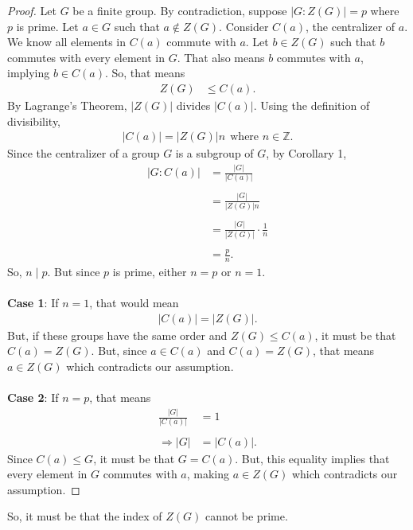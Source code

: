 \documentclass[12pt, letterpaper]{article}
\begin{document}
\begin{proof}
    Let $G$ be a finite group. By contradiction, suppose $|G:Z(G)| = p$ where $p$ is prime. Let $a \in G$ such that $a \notin Z(G)$. Consider $C(a)$, the centralizer of $a$. We know all elements in $C(a)$ commute with $a$. Let $b \in Z(G)$ such that $b$ commutes with every element in $G$. That also means $b$ commutes with $a$, implying $b \in C(a)$. So, that means
    \begin{align*}
        Z(G) &\leq C(a).
    \end{align*}
    By Lagrange's Theorem, $|Z(G)|$ divides $|C(a)|$. Using the definition of divisibility,
    \begin{align*}
        |C(a)| = |Z(G)|n \ \ \text{where $n \in \mathbb{Z}$}.
    \end{align*}
    Since the centralizer of a group $G$ is a subgroup of $G$, by Corollary 1,
    \begin{align*}
        |G:C(a)| &= \frac{|G|}{|C(a)|} \\ \\
        &= \frac{|G|}{|Z(G)|n} \\ \\
        &= \frac{|G|}{|Z(G)|} \cdot \frac{1}{n} \\ \\
        &= \frac{p}{n}.
    \end{align*}
    So, $n \mid p$. But since $p$ is prime, either $n = p$ or $n = 1$. \\ \\
    \textbf{Case 1}: If $n = 1$, that would mean
    \begin{align*}
        |C(a)| = |Z(G)|.
    \end{align*}
  But, if these groups have the same order and $Z(G) \leq C(a)$, it must be that $C(a) = Z(G)$. But, since $a \in C(a)$ and $C(a) = Z(G)$, that means $a \in Z(G)$ which contradicts our assumption. \\ \\
    \textbf{Case 2}: If $n = p$, that means 
    \begin{align*}
        \frac{|G|}{|C(a)|} & = 1 \\ \\
        \Rightarrow |G| &= |C(a)|.
    \end{align*}
    Since $C(a) \leq G$, it must be that $G = C(a)$. But, this equality implies that every element in $G$ commutes with $a$, making $a \in Z(G)$ which contradicts our assumption.
\end{proof}
So, it must be that the index of $Z(G)$ cannot be prime.
\end{document}
